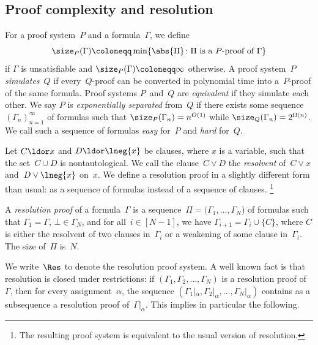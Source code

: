 \documentclass[12pt]{article}
\begin{document}
\subsection{Proof complexity and resolution}
\label{sec:proof-complexity-and-resolution}

For a proof system~$P$ and a formula~$\Gamma$, we define
\begin{equation*}
  \size_P(\Gamma) \coloneqq \min \{\abs{\Pi}
  \colon \Pi \text{ is a $P$-proof of } \Gamma\}
\end{equation*}
if $\Gamma$ is unsatisfiable and $\size_P(\Gamma) \coloneqq \infty$ otherwise.
A proof system~$P$ \emph{simulates}~$Q$ if every~$Q$-proof
can be converted in polynomial time into a~$P$-proof of the same formula.
Proof systems $P$~and~$Q$ are \emph{equivalent} if they simulate each other.
We say $P$ is \emph{exponentially separated} from~$Q$
if there exists some sequence~$(\Gamma_n)_{n=1}^\infty$ of formulas
such that $\size_P(\Gamma_n) = n^{O(1)}$ while $\size_Q(\Gamma_n) = 2^{\Omega(n)}$.
We call such a sequence of formulas \emph{easy} for~$P$ and \emph{hard} for~$Q$.

Let $C \ldor x$ and $D \ldor \lneg{x}$ be clauses,
where $x$ is a variable, such that the set~$C \cup D$ is nontautological.
We call the clause~$C \lor D$ the \emph{resolvent}
of~$C \lor x$ and~$D \lor \lneg{x}$ on~$x$.
We define a resolution proof in a slightly different form than usual:
as a sequence of formulas instead of a sequence of clauses.%
\footnote{The resulting proof system is equivalent
  to the usual version of resolution.}

\begin{definition}
  A \emph{resolution proof} of a formula~$\Gamma$
  is a sequence~$\Pi = (\Gamma_1, \dots, \Gamma_N$) of formulas
  such that $\Gamma_1 = \Gamma$, $\bot \in \Gamma_N$,
  and for all~$i \in [N - 1]$, we have $\Gamma_{i+1} = \Gamma_i \cup \{C\}$,
  where $C$ is either the resolvent of two clauses in~$\Gamma_i$
  or a weakening of some clause in~$\Gamma_i$.
  The size of~$\Pi$ is~$N$.
\end{definition}

We write~$\Res$ to denote the resolution proof system.
A well known fact is that resolution is closed under restrictions:
if $(\Gamma_1, \Gamma_2, \dots, \Gamma_N)$ is a resolution proof of~$\Gamma$,
then for every assignment~$\alpha$,
the sequence $(\Gamma_1|_\alpha, \Gamma_2|_\alpha, \dots, \Gamma_N|_\alpha)$
contains as a subsequence a resolution proof of~$\Gamma|_\alpha$.
This implies in particular the following.
\end{document}
